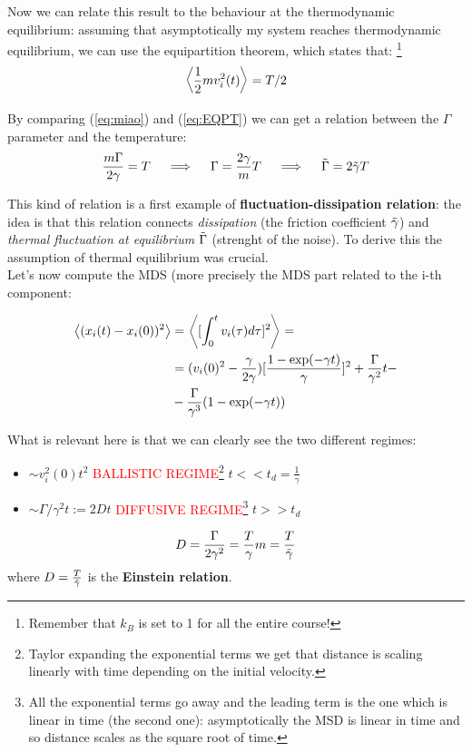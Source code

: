 \documentclass[\main/main.tex]{subfiles}
\begin{document}
Now we can relate this result to the behaviour at the thermodynamic equilibrium: assuming that asymptotically my system reaches thermodynamic equilibrium, we can use the equipartition theorem, which states that: \footnote{Remember that $k_B$ is set to 1 for all the entire course!}
\begin{eqnarray}
\left\langle \frac{1}{2}mv_i^2(t) \right\rangle=T/2
\label{eq:EQPT}
\end{eqnarray}

By comparing (\ref{eq:miao}) and (\ref{eq:EQPT}) we can get a relation between the $\Gamma$ parameter and the temperature:
\begin{eqnarray}
\frac{m\Gamma}{2\gamma} = T \quad \implies \quad \Gamma=\frac{2\gamma}{m}T \quad \implies \quad {\Tilde{\Gamma}= 2\Tilde{\gamma} T}
\end{eqnarray}

This kind of relation is a first example of \textbf{fluctuation-dissipation relation}: the idea is that this relation connects \textit{dissipation} (the friction coefficient $\Tilde{\gamma}$) and \textit{thermal fluctuation at equilibrium} $\Tilde{\Gamma}$ (strenght of the noise). To derive this the assumption of thermal equilibrium was crucial. \\

Let's now compute the MDS (more precisely the MDS part related to the i-th component:

\begin{align}
\left\langle (x_i(t)-x_i(0))^2 \right\rangle&=\left\langle [\int_0^t v_i(\tau)d\tau]^2 \right\rangle= \\
&=(v_i(0)^2 - \frac{\gamma}{2\gamma})[\frac{1-\exp(-\gamma t)}{\gamma}]^2+\frac{\Gamma}{\gamma^2}t -\\
&-\frac{\Gamma}{\gamma^3}(1-\exp(-\gamma t))
\end{align}

What is relevant here is that we can clearly see the two different regimes:

\begin{itemize}
    \item $\sim v_i^2(0)t^2$ \quad \textcolor{red}{BALLISTIC REGIME\footnote{Taylor expanding the exponential terms we get that distance is scaling linearly with time depending on the initial velocity.}} \quad $t<<t_d=\frac{1}{\gamma}$
    \item $\sim \Gamma/\gamma^2 t:=2Dt$ \quad \textcolor{red}{DIFFUSIVE REGIME\footnote{All the exponential terms go away and the leading term is the one which is linear in time (the second one): asymptotically the MSD is linear in time and so distance scales as the square root of time.}} \quad $t>>t_d$
\end{itemize}
\begin{eqnarray}
D=\frac{\Gamma}{2\gamma^2}=\frac{T}{\gamma}m = \frac{T}{\Tilde{\gamma}}
\end{eqnarray}
where $D=\frac{T}{\Tilde{\gamma}}$ is the \textbf{Einstein relation}. \\
\end{document}
